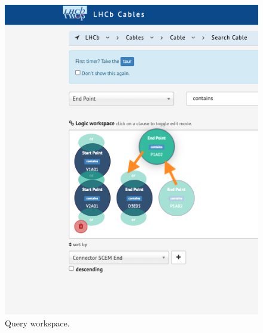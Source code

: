 \begin{figure}[H]
    \centering
    \begin{minipage}[t]{.4\textwidth}
        \centering
        \includegraphics[width=\linewidth]{figuras/fence_search_1_sm.png}
        \caption{Query workspace.}
        \label{fence-ss-1}
    \end{minipage}
    \hfill
    \begin{minipage}[t]{.4\textwidth}
        \centering

\end{minipage}
\end{figure}
